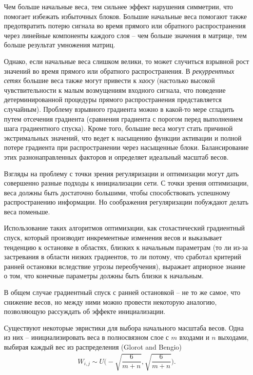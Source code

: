 \documentclass[%
	11pt,
	a4paper,
	utf8,
]{article}
\begin{document}
Чем больше начальные веса, тем сильнее эффект нарушения симметрии, что помогает избежать избыточных блоков. Большие начальные веса помогают также предотвратить потерю сигнала во время прямого или обратного распространения через линейные компоненты каждого слоя -- чем больше значения в матрице, тем больше результат умножения матриц.

Однако, если начальные веса слишком велики, то может случиться взрывной рост значений во время прямого или обратного распространения. В \emph{рекуррентных сетях} большие веса также могут привести к \emph{хаосу} (настолько высокой чувствительности к малым возмущениям входного сигнала, что поведение детерминированной процедуры прямого распространения представляется случайным). Проблему взрывного градиента можно в какой-то мере сгладить путем отсечения градиента (сравнения градиента с порогом перед выполнением шага градиентного спуска). Кроме того, большие веса могут стать причиной экстримальных значений, что ведет к насыщению функции активации и полной потере градиента при распространении через насыщенные блоки. Балансирование этих разнонаправленных факторов и определяет идеальный масштаб весов.

Взгляды на проблему с точки зрения регуляризации и оптимизации могут дать совершенно разные подходы к инициализации сети. С точки зрения оптимизации, веса должны быть достаточно большими, чтобы способствовать успешному распространению информации. Но соображения регуляризации побуждают делать веса поменьше. 

Использование таких алгоритмов оптимизации, как стохастический градиентный спуск, который производит инкрементные изменения весов и выказывает тенденцию к остановке в областях, близких к начальным параметрам (то ли из-за застревания в области низких градиентов, то ли потому, что сработал критерий ранней остановки вследствие угрозы переобучения), выражает априорное знание о том, что конечные параметры должны быть близки к начальным.

В общем случае градиентный спуск с ранней остановкой -- не то же самое, что снижение весов, но между ними можно провести некоторую аналогию, позволяющую рассуждать об эффекте инициализации.

Существуют некоторые эвристики для выбора начального масштаба весов. Одна из них -- инициализировать веса в полносвязном слое с $ m $ входами и $ n $ выходами, выбирая каждый вес из распределения (Glorot and Bengio)
\begin{align*}
	W_{i, j} \sim U\Big( - \sqrt{ \dfrac{6}{m +n} }, \sqrt{ \dfrac{6}{m + n} } \Big).
\end{align*}
\end{document}
